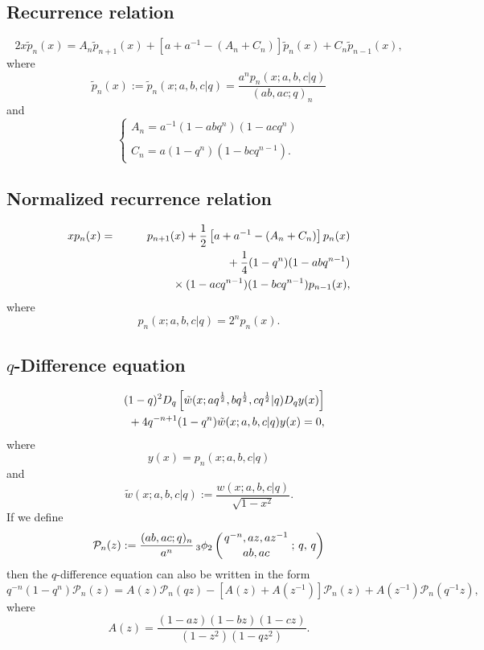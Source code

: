 \documentclass[envcountchap,graybox]{svmono}
\newcommand{\qhyp}[5]{\mbox{}_{#1}{\phi}_{#2}
\left(\genfrac{}{}{0pt}{}{#3}{#4}\,;\,q,\,#5\right)}
\newcommand{\mathindent}{\hspace{7.5mm}}
\begin{document}
\subsection*{Recurrence relation}
\begin{equation}
\label{RecContDualqHahn}
2x{\tilde p}_n(x)=A_n{\tilde p}_{n+1}(x)+\left[a+a^{-1}-\left(A_n+C_n\right)\right]{\tilde p}_n(x)+C_n{\tilde p}_{n-1}(x),
\end{equation}
where
$${\tilde p}_n(x):={\tilde p}_n(x;a,b,c|q)=\frac{a^np_n(x;a,b,c|q)}{(ab,ac;q)_n}$$
and
$$\left\{\begin{array}{l}
\displaystyle A_n=a^{-1}(1-abq^n)(1-acq^n)\\
\\
\displaystyle C_n=a(1-q^n)(1-bcq^{n-1}).
\end{array}\right.$$

\subsection*{Normalized recurrence relation}
\begin{eqnarray}
\label{NormRecContDualqHahn}
xp_n(x)&=&p_{n+1}(x)+\frac{1}{2}\left[a+a^{-1}-(A_n+C_n)\right]p_n(x)\nonumber\\
& &{}\mathindent{}+\frac{1}{4}(1-q^n)(1-abq^{n-1})\nonumber\\
& &{}\mathindent\mathindent{}\times(1-acq^{n-1})(1-bcq^{n-1})p_{n-1}(x),
\end{eqnarray}
where
$$p_n(x;a,b,c|q)=2^np_n(x).$$

\subsection*{$q$-Difference equation}
\begin{eqnarray}
\label{dvContDualqHahn1}
& &(1-q)^2D_q\left[{\tilde w}(x;aq^{\frac{1}{2}},bq^{\frac{1}{2}},
cq^{\frac{1}{2}}|q)D_qy(x)\right]\nonumber\\
& &{}\mathindent{}+4q^{-n+1}(1-q^n){\tilde w}(x;a,b,c|q)y(x)=0,
\end{eqnarray}
where
$$y(x)=p_n(x;a,b,c|q)$$
and
$${\tilde w}(x;a,b,c|q):=\frac{w(x;a,b,c|q)}{\sqrt{1-x^2}}.$$
If we define
$${\mathcal P}_n(z):=\frac{(ab,ac;q)_n}{a^n}\,\qhyp{3}{2}{q^{-n},az,az^{-1}}{ab,ac}{q}$$
then the $q$-difference equation can also be written in the form
\begin{equation}
\label{dvContDualqHahn2}
q^{-n}(1-q^n){\mathcal P}_n(z)=A(z){\mathcal P}_n(qz)-\left[A(z)+A(z^{-1})\right]{\mathcal P}_n(z)
+A(z^{-1}){\mathcal P}_n(q^{-1}z),
\end{equation}
where
$$A(z)=\frac{(1-az)(1-bz)(1-cz)}{(1-z^2)(1-qz^2)}.$$
\end{document}
